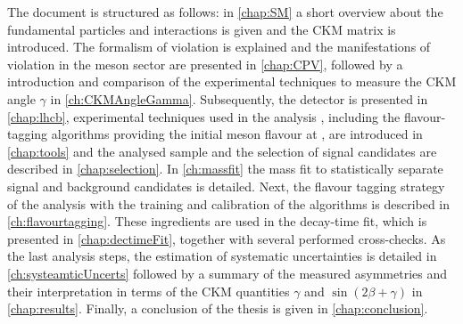 The document is structured as follows:
in \cref{chap:SM} a short overview about the fundamental particles and interactions is given and the CKM matrix is introduced.
The formalism of \CP violation is explained and the manifestations of \CP violation in the \B meson sector are presented in \cref{chap:CPV}, followed by a introduction and comparison of the experimental techniques to measure the CKM angle $\gamma$  in \cref{ch:CKMAngleGamma}.
Subsequently, the \lhcb detector is presented in \cref{chap:lhcb}, experimental techniques used in the analysis , including the flavour-tagging algorithms providing the initial \B meson flavour at \lhcb, are introduced in \cref{chap:tools} and the analysed sample and the selection of signal candidates are described in \cref{chap:selection}.
In \cref{ch:massfit} the mass fit to statistically separate signal and background candidates is detailed.
Next, the flavour tagging strategy of the analysis with the training and calibration of the algorithms is described in \cref{ch:flavourtagging}.
These ingredients are used in the decay-time fit, which is presented in \cref{chap:dectimeFit}, together with several performed cross-checks.
As the last analysis steps, the estimation of systematic uncertainties is detailed in \cref{ch:systeamticUncerts} followed by a summary of the measured \CP asymmetries and their interpretation in terms of the CKM quantities $\gamma$ and $\sin\!\left(2\beta+\gamma\right)$ in \cref{chap:results}.
Finally, a conclusion of the thesis is given in \cref{chap:conclusion}.
